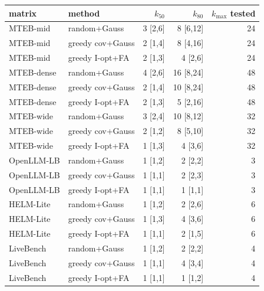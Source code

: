 \begin{tabular}{llrrr}\toprule
matrix & method & $k_{50}$ & $k_{80}$ & $k_{\max}$ tested \\\midrule
MTEB-mid & random+Gauss & 3 \scriptsize[2,6] & 8 \scriptsize[6,12] & 24 \\
MTEB-mid & greedy cov+Gauss & 2 \scriptsize[1,4] & 8 \scriptsize[4,16] & 24 \\
MTEB-mid & greedy I-opt+FA & 2 \scriptsize[1,3] & 4 \scriptsize[2,6] & 24 \\
MTEB-dense & random+Gauss & 4 \scriptsize[2,6] & 16 \scriptsize[8,24] & 48 \\
MTEB-dense & greedy cov+Gauss & 2 \scriptsize[1,4] & 10 \scriptsize[8,24] & 48 \\
MTEB-dense & greedy I-opt+FA & 2 \scriptsize[1,3] & 5 \scriptsize[2,16] & 48 \\
MTEB-wide & random+Gauss & 3 \scriptsize[2,4] & 10 \scriptsize[8,12] & 32 \\
MTEB-wide & greedy cov+Gauss & 2 \scriptsize[1,2] & 8 \scriptsize[5,10] & 32 \\
MTEB-wide & greedy I-opt+FA & 1 \scriptsize[1,3] & 4 \scriptsize[3,6] & 32 \\
OpenLLM-LB & random+Gauss & 1 \scriptsize[1,2] & 2 \scriptsize[2,2] & 3 \\
OpenLLM-LB & greedy cov+Gauss & 1 \scriptsize[1,1] & 2 \scriptsize[2,3] & 3 \\
OpenLLM-LB & greedy I-opt+FA & 1 \scriptsize[1,1] & 1 \scriptsize[1,1] & 3 \\
HELM-Lite & random+Gauss & 1 \scriptsize[1,2] & 2 \scriptsize[2,6] & 6 \\
HELM-Lite & greedy cov+Gauss & 1 \scriptsize[1,3] & 4 \scriptsize[3,6] & 6 \\
HELM-Lite & greedy I-opt+FA & 1 \scriptsize[1,1] & 2 \scriptsize[1,5] & 6 \\
LiveBench & random+Gauss & 1 \scriptsize[1,2] & 2 \scriptsize[2,2] & 4 \\
LiveBench & greedy cov+Gauss & 1 \scriptsize[1,1] & 4 \scriptsize[3,4] & 4 \\
LiveBench & greedy I-opt+FA & 1 \scriptsize[1,1] & 1 \scriptsize[1,2] & 4 \\
\bottomrule\end{tabular}
